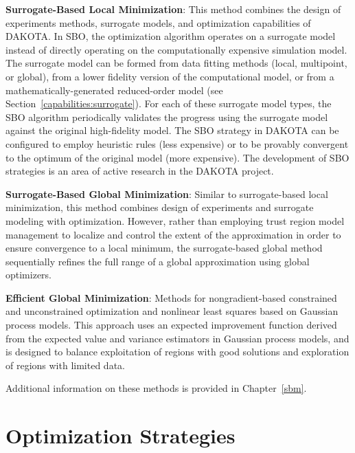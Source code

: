 \textbf{Surrogate-Based Local Minimization}: This method combines
the design of experiments methods, surrogate models, and optimization
capabilities of DAKOTA.
In SBO, the optimization algorithm operates on a surrogate model
instead of directly operating on the computationally expensive
simulation model.  The surrogate model can be formed from data fitting
methods (local, multipoint, or global), from a lower fidelity version
of the computational model, or from a mathematically-generated
reduced-order model (see Section~\ref{capabilities:surrogate}). For
each of these surrogate model types, the SBO algorithm periodically
validates the progress using the surrogate model against the original
high-fidelity model.  The SBO strategy in DAKOTA can be configured to
employ heuristic rules (less expensive) or to be provably convergent
to the optimum of the original model (more expensive). The development
of SBO strategies is an area of active research in the DAKOTA project.

\textbf{Surrogate-Based Global Minimization}: Similar to surrogate-based
local minimization, this method combines design of experiments and
surrogate modeling with optimization.  However, rather than employing
trust region model management to localize and control the extent of
the approximation in order to ensure convergence to a local minimum,
the surrogate-based global method sequentially refines the full range
of a global approximation using global optimizers.

\textbf{Efficient Global Minimization}: Methods for nongradient-based
constrained and unconstrained optimization and nonlinear least squares
based on Gaussian process models.  This approach uses an expected
improvement function derived from the expected value and variance
estimators in Gaussian process models, and is designed to balance
exploitation of regions with good solutions and exploration of regions
with limited data.~\cite{Jon98}

Additional information on these methods is provided in Chapter~\ref{sbm}.

\section{Optimization Strategies}\label{capabilities:optimization2}

